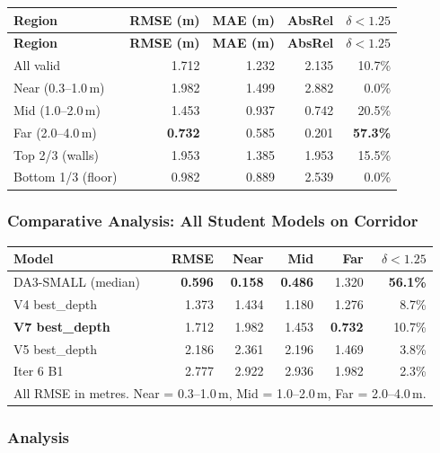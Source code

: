 \documentclass[11pt,a4paper]{article}
\begin{document}
\begin{longtable}{lrrrr}
\toprule
\textbf{Region} & \textbf{RMSE (m)} & \textbf{MAE (m)} & \textbf{AbsRel} & \textbf{$\delta < 1.25$} \\
\midrule
\endfirsthead
\toprule
\textbf{Region} & \textbf{RMSE (m)} & \textbf{MAE (m)} & \textbf{AbsRel} & \textbf{$\delta < 1.25$} \\
\midrule
\endhead
All valid          & 1.712 & 1.232 & 2.135 & 10.7\% \\
Near (0.3--1.0\,m) & 1.982 & 1.499 & 2.882 &  0.0\% \\
Mid (1.0--2.0\,m)  & 1.453 & 0.937 & 0.742 & 20.5\% \\
Far (2.0--4.0\,m)  & \textcolor{improved}{\textbf{0.732}} & 0.585 & 0.201 & \textcolor{improved}{\textbf{57.3\%}} \\
Top 2/3 (walls)    & 1.953 & 1.385 & 1.953 & 15.5\% \\
Bottom 1/3 (floor) & 0.982 & 0.889 & 2.539 &  0.0\% \\
\bottomrule
\end{longtable}

\subsubsection{Comparative Analysis: All Student Models on Corridor}

\begin{longtable}{lrrrrr}
\toprule
\textbf{Model} & \textbf{RMSE} & \textbf{Near} & \textbf{Mid} & \textbf{Far} & \textbf{$\delta < 1.25$} \\
\midrule
\endfirsthead
DA3-SMALL (median)     & \textbf{0.596} & \textbf{0.158} & \textbf{0.486} & 1.320 & \textbf{56.1\%} \\
V4 best\_depth         & 1.373 & 1.434 & 1.180 & 1.276 &  8.7\% \\
\textbf{V7 best\_depth} & 1.712 & 1.982 & 1.453 & \textcolor{improved}{\textbf{0.732}} & 10.7\% \\
V5 best\_depth         & 2.186 & 2.361 & 2.196 & 1.469 &  3.8\% \\
Iter 6 B1              & 2.777 & 2.922 & 2.936 & 1.982 &  2.3\% \\
\bottomrule
\multicolumn{6}{l}{\footnotesize All RMSE in metres. Near = 0.3--1.0\,m, Mid = 1.0--2.0\,m, Far = 2.0--4.0\,m.} \\
\end{longtable}

\subsubsection{Analysis}
\end{document}
